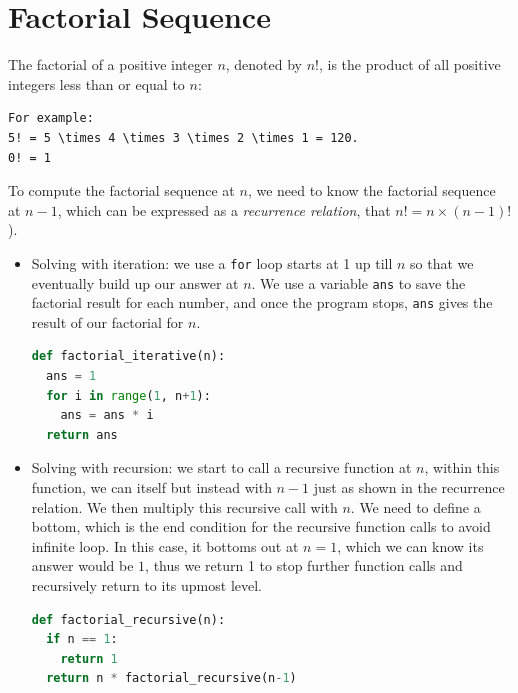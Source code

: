 \documentclass[../main.tex]{subfiles}
\begin{document}
\section{Factorial Sequence}  The factorial of a positive integer $n$, denoted by $n!$, is the product of all positive integers less than or equal to $n$:
\begin{lstlisting}[numbers=none]
For example: 
5! = 5 \times 4 \times 3 \times 2 \times 1 = 120.
0! = 1
\end{lstlisting}
To compute the factorial sequence at $n$, we need to know the factorial sequence at $n-1$, which can be expressed as a \textit{recurrence relation}, that $n!= n \times (n-1)!$). 
\begin{itemize}
    \item Solving with iteration: we use a \texttt{for} loop starts at 1 up till $n$ so that we eventually build up our answer at $n$. We use a variable \texttt{ans} to save the factorial result for each number, and once the program stops, \texttt{ans} gives the result of our factorial for $n$.
\begin{lstlisting}[language=Python]
def factorial_iterative(n):
  ans = 1
  for i in range(1, n+1):
    ans = ans * i
  return ans
\end{lstlisting}
\item Solving with recursion: we start to call a recursive function at $n$, within this function, we can itself but instead with $n-1$ just as shown in the recurrence relation. We then multiply this recursive call with $n$. We need to define a bottom, which is the end condition for the recursive function calls to avoid infinite loop. In this case, it bottoms out at $n=1$, which we can know its answer would be $1$, thus we return 1 to stop further function calls and recursively return to its upmost level.
\begin{lstlisting}[language=Python]
def factorial_recursive(n):
  if n == 1:
    return 1
  return n * factorial_recursive(n-1)
\end{lstlisting}
\end{itemize}
\end{document}
